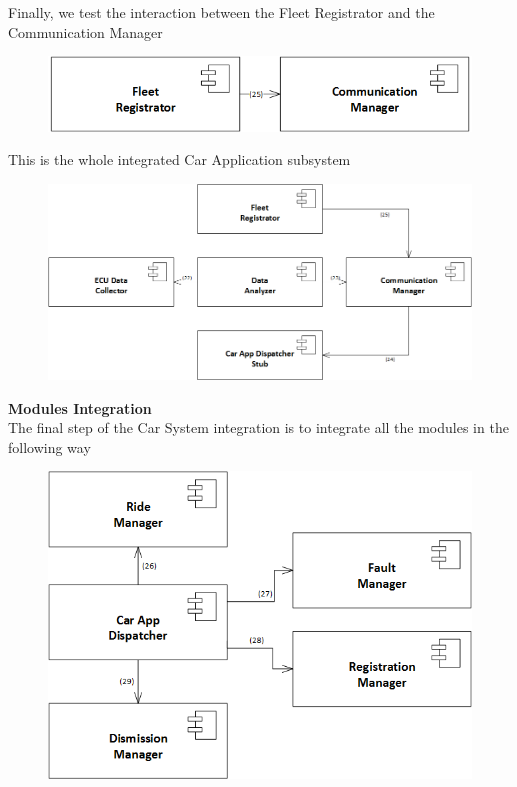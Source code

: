 \documentclass{article}
\begin{document}
Finally, we test the interaction between the Fleet Registrator and the Communication Manager
\begin{figure}[H]
\includegraphics[scale=0.5]{CarApplication/CarApplication3}
\centering
\end{figure}
This is the whole integrated Car Application subsystem
\begin{figure}[H]
\includegraphics[scale=0.5]{CarApplication/CarApplicationIntegration}
\centering
\end{figure}
\textbf{Modules Integration}
\\
The final step of the Car System integration is to integrate all the modules in the following way
\begin{figure}[H]
\includegraphics[scale=0.5]{Dispatcher/Dispatcher} 
\centering
\end{figure}
\end{document}
